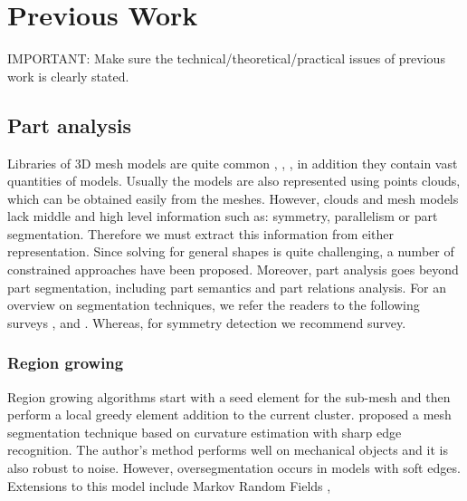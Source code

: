 \chapter{Previous Work}
\label{ch:prevWork}

IMPORTANT: Make sure the technical/theoretical/practical issues of previous work is clearly stated.

\section{Part analysis}
\label{sec:partAnalysis}

Libraries of 3D mesh models are quite common \cite{Trimble2014}, \cite{GrabCAD2014}, \cite{Autodesk2014}, in addition they contain vast quantities of models.   
Usually the models are also represented using points clouds, which can be obtained easily from the meshes.
However, clouds and mesh models lack middle and high level information such as: symmetry, parallelism or part segmentation.
Therefore we must extract this information from either representation.
Since solving for general shapes is quite challenging, a number of constrained approaches have been proposed.
Moreover, part analysis goes beyond part segmentation, including part semantics and part relations analysis. 
For an overview on segmentation techniques, we refer the readers to the following surveys \cite{Varady1997}, \cite{Agathos2007} and \cite{Shamir2008}.
Whereas, for symmetry detection we recommend \cite{Mitra2013} survey.

\subsection{Region growing}

Region growing algorithms start with a seed element for the sub-mesh and then perform a local greedy element addition to the current cluster.
\cite{Mizoguchi2006} proposed a mesh segmentation technique based on curvature estimation with sharp edge recognition.
The author's method performs well on mechanical objects and it is also robust to noise.
However, oversegmentation occurs in models with soft edges.
Extensions to this model include Markov Random Fields \cite{Lavoue2008},


